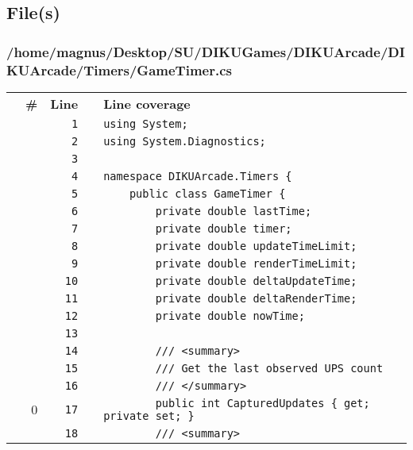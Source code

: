 \documentclass[a4paper,landscape,10pt]{article}
\begin{document}
\subsection{File(s)}
\subsubsection{/home/magnus/Desktop/SU/DIKUGames/DIKUArcade/DIKUArcade/Timers/GameTimer.cs}
\begin{longtable}[l]{lrrll}
\textbf{} & \textbf{\#} & \textbf{Line} & \textbf{} & \textbf{Line coverage}\\
\cellcolor{gray} &  & \verb~1~ & & \verb~using System;~\\
\cellcolor{gray} &  & \verb~2~ & & \verb~using System.Diagnostics;~\\
\cellcolor{gray} &  & \verb~3~ & & \verb~~\\
\cellcolor{gray} &  & \verb~4~ & & \verb~namespace DIKUArcade.Timers {~\\
\cellcolor{gray} &  & \verb~5~ & & \verb~    public class GameTimer {~\\
\cellcolor{gray} &  & \verb~6~ & & \verb~        private double lastTime;~\\
\cellcolor{gray} &  & \verb~7~ & & \verb~        private double timer;~\\
\cellcolor{gray} &  & \verb~8~ & & \verb~        private double updateTimeLimit;~\\
\cellcolor{gray} &  & \verb~9~ & & \verb~        private double renderTimeLimit;~\\
\cellcolor{gray} &  & \verb~10~ & & \verb~        private double deltaUpdateTime;~\\
\cellcolor{gray} &  & \verb~11~ & & \verb~        private double deltaRenderTime;~\\
\cellcolor{gray} &  & \verb~12~ & & \verb~        private double nowTime;~\\
\cellcolor{gray} &  & \verb~13~ & & \verb~~\\
\cellcolor{gray} &  & \verb~14~ & & \verb~        /// <summary>~\\
\cellcolor{gray} &  & \verb~15~ & & \verb~        /// Get the last observed UPS count~\\
\cellcolor{gray} &  & \verb~16~ & & \verb~        /// </summary>~\\
\cellcolor{red} & 0 & \verb~17~ & & \verb~        public int CapturedUpdates { get; private set; }~\\
\cellcolor{gray} &  & \verb~18~ & & \verb~        /// <summary>~\\

\end{longtable}
\end{document}
